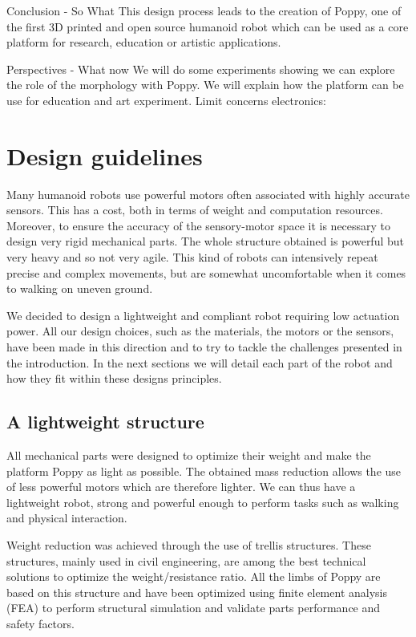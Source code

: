 Conclusion - So What
This design process leads to the creation of Poppy, one of the first 3D printed and open source humanoid robot which can be used as a core platform for research, education or artistic applications.

Perspectives - What now
We will do some experiments showing we can explore the role of the morphology with Poppy.
We will explain how the platform can be use for education and art experiment.
Limit concerns electronics:




\section{Design guidelines} %

Many humanoid robots use powerful motors often associated with highly accurate sensors. This has a cost, both in terms of weight and computation resources. Moreover, to ensure the accuracy of the sensory-motor space it is necessary to design very rigid mechanical parts. The whole structure obtained is powerful but very heavy and so not very agile. This kind of robots can intensively repeat precise and complex movements, but are somewhat uncomfortable when it comes to walking on uneven ground.

We decided to design a lightweight and compliant robot requiring low actuation power. All our design choices, such as the materials, the motors or the sensors, have been made in this direction and to try to tackle the challenges presented in the introduction. In the next sections we will detail each part of the robot and how they fit within these designs principles.

\subsection{A lightweight structure} %

All mechanical parts were designed to optimize their weight and make the platform Poppy as light as possible. The obtained mass reduction allows the use of less powerful motors which are therefore lighter. We can thus have a lightweight robot, strong and powerful enough to perform tasks such as walking and physical interaction.

Weight reduction was achieved through the use of trellis structures. These structures, mainly used in civil engineering, are among the best technical solutions to optimize the weight/resistance ratio. All the limbs of Poppy are based on this structure and have been optimized using finite element analysis (FEA) to perform structural simulation and validate parts performance and safety factors.

